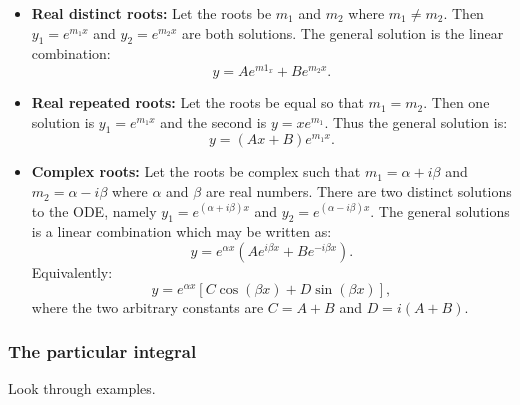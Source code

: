 \documentclass{article}
\begin{document}
\begin{itemize}
    \item \textbf{Real distinct roots: }Let the roots be $m_1$ and $m_2$ where $m_1\neq m_2$. Then $y_1 = e^{m_1 x}$ and $y_2 = e^{m_2 x}$ are both solutions. The general solution is the linear combination:
    \begin{equation}
        y = Ae^{m1_x} + Be^{m_2 x}.
    \end{equation}
    \item \textbf{Real repeated roots: }Let the roots be equal so that $m_1=m_2$. Then one solution is $y_1 = e^{m_1 x}$ and the second is $y=xe^{m_1}$. Thus the general solution is:
    \begin{equation}
        y = (Ax + B)e^{m_1 x}.
    \end{equation}
    \item \textbf{Complex roots: }Let the roots be complex such that $m_1 = \alpha+i\beta$ and $m_2 = \alpha - i\beta$ where $\alpha$ and $\beta$ are real numbers. There are two distinct solutions to the ODE, namely $y_1 = e^{(\alpha + i\beta)x}$ and $y_2 = e^{(\alpha - i\beta)x}$. The general solutions is a linear combination which may be written as:
    \begin{equation}
        y = e^{\alpha x}(Ae^{i\beta x}+Be^{-i\beta x}).
    \end{equation}
    Equivalently:
    \begin{equation}
        y = e^{\alpha x}[C\cos{(\beta x)}+D\sin{(\beta x)}],
    \end{equation}
    where the two arbitrary constants are $C=A+B$ and $D = i(A+B)$.
\end{itemize}

\subsubsection{The particular integral}
Look through examples.
\end{document}
